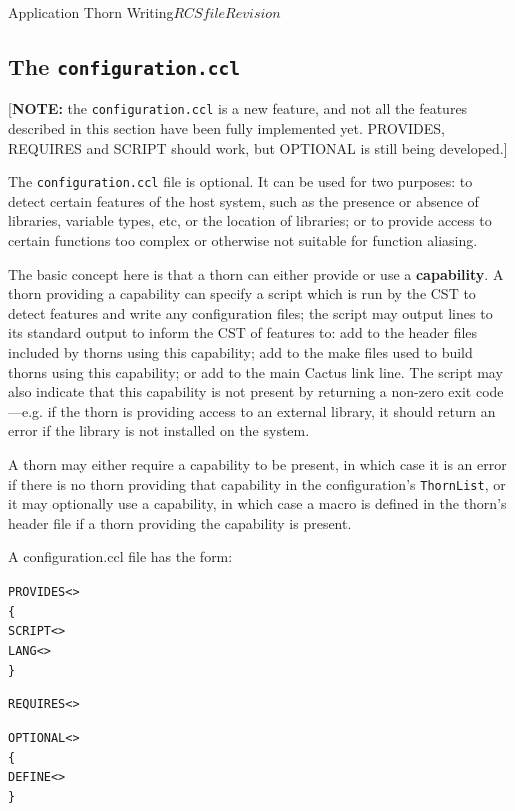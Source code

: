 \begin{cactuspart}{Application Thorn Writing}{$RCSfile$}{$Revision$}

\subsection{The \texttt{configuration.ccl}}
\label{subsec:configuration_ccl}

[{\bf NOTE:} the \texttt{configuration.ccl} is a new feature, and not all the
features described in this section have been fully implemented yet.
PROVIDES, REQUIRES and SCRIPT should work, but OPTIONAL is still
being developed.]

The \texttt{configuration.ccl} file is optional.  It can be used for two
purposes: to detect certain features of the host system, such as the
presence or absence of libraries, variable types, etc, or the
location of libraries; or to provide access to certain functions too
complex or otherwise not suitable for function aliasing.

The basic concept here is that a thorn can either provide or use a
{\bf capability}.  A thorn providing a capability can specify a script
which is run by the CST to detect features and write any configuration
files;  the script may output lines to its standard output to inform
the CST of features to: add to the header files included by thorns
using this capability; add to the make files used to build thorns
using this capability; or add to the main Cactus link line.  The script
may also indicate that this capability is not present by returning a
non-zero exit code---e.g. if the thorn is providing access to an
external library, it should return an error if the library is not
installed on the system.

A thorn may either require a capability to be present, in which case
it is an error if there is no thorn providing that capability in the
configuration's \texttt{ThornList}, or it may optionally use a capability, in
which case a macro is defined in the thorn's header file if a thorn
providing the capability is present.

A configuration.ccl file has the form:

\begin{alltt}
PROVIDES <>
\{
  SCRIPT <>
  LANG <>
\}

REQUIRES  <>

OPTIONAL <>
\{
  DEFINE <>
\}


\end{alltt}
\end{cactuspart}
